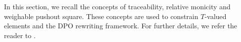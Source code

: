 In this section, we recall the concepts of traceability, relative monicity and weighable pushout square. These concepts are used to constrain \(T\)-valued elements and the DPO rewriting framework.  
For further details, we refer the reader to \cite[Section 4.1 and 4.2]{endrullis2024generalized}.



